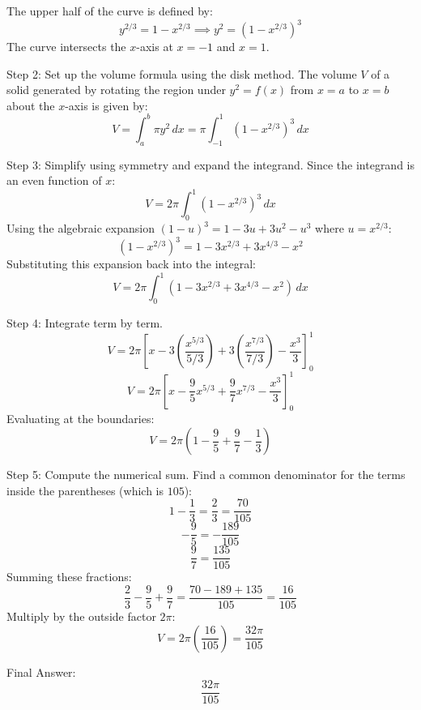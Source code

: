 \documentclass{article}
\begin{document}
The upper half of the curve is defined by:
\[
y^{2/3} = 1 - x^{2/3} \implies y^2 = (1 - x^{2/3})^3
\]
The curve intersects the $x$-axis at $x = -1$ and $x = 1$.

Step 2: Set up the volume formula using the disk method.
The volume $V$ of a solid generated by rotating the region under $y^2 = f(x)$ from $x = a$ to $x = b$ about the $x$-axis is given by:
\[
V = \int_{a}^{b} \pi y^2 \, dx = \pi \int_{-1}^{1} (1 - x^{2/3})^3 \, dx
\]

Step 3: Simplify using symmetry and expand the integrand.
Since the integrand is an even function of $x$:
\[
V = 2\pi \int_{0}^{1} (1 - x^{2/3})^3 \, dx
\]
Using the algebraic expansion $(1-u)^3 = 1 - 3u + 3u^2 - u^3$ where $u = x^{2/3}$:
\[
(1 - x^{2/3})^3 = 1 - 3x^{2/3} + 3x^{4/3} - x^2
\]
Substituting this expansion back into the integral:
\[
V = 2\pi \int_{0}^{1} (1 - 3x^{2/3} + 3x^{4/3} - x^2) \, dx
\]

Step 4: Integrate term by term.
\[
V = 2\pi \left[ x - 3\left(\frac{x^{5/3}}{5/3}\right) + 3\left(\frac{x^{7/3}}{7/3}\right) - \frac{x^3}{3} \right]_{0}^{1}
\]
\[
V = 2\pi \left[ x - \frac{9}{5} x^{5/3} + \frac{9}{7} x^{7/3} - \frac{x^3}{3} \right]_{0}^{1}
\]
Evaluating at the boundaries:
\[
V = 2\pi \left( 1 - \frac{9}{5} + \frac{9}{7} - \frac{1}{3} \right)
\]

Step 5: Compute the numerical sum.
Find a common denominator for the terms inside the parentheses (which is $105$):
\[
1 - \frac{1}{3} = \frac{2}{3} = \frac{70}{105}
\]
\[
-\frac{9}{5} = -\frac{189}{105}
\]
\[
\frac{9}{7} = \frac{135}{105}
\]
Summing these fractions:
\[
\frac{2}{3} - \frac{9}{5} + \frac{9}{7} = \frac{70 - 189 + 135}{105} = \frac{16}{105}
\]
Multiply by the outside factor $2\pi$:
\[
V = 2\pi \left( \frac{16}{105} \right) = \frac{32\pi}{105}
\]

Final Answer:
\[
\boxed{\frac{32\pi}{105}}
\]
\end{document}
